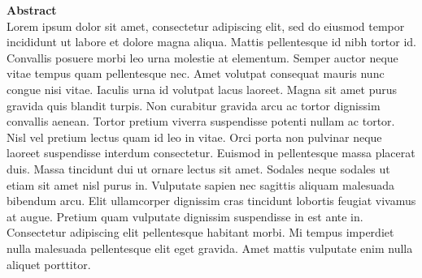 {\Large\textbf{Abstract}}\\

Lorem ipsum dolor sit amet, consectetur adipiscing elit, sed do eiusmod tempor incididunt ut labore et dolore magna aliqua. Mattis pellentesque id nibh tortor id. Convallis posuere morbi leo urna molestie at elementum. Semper auctor neque vitae tempus quam pellentesque nec. Amet volutpat consequat mauris nunc congue nisi vitae. Iaculis urna id volutpat lacus laoreet. Magna sit amet purus gravida quis blandit turpis. Non curabitur gravida arcu ac tortor dignissim convallis aenean. Tortor pretium viverra suspendisse potenti nullam ac tortor. Nisl vel pretium lectus quam id leo in vitae. Orci porta non pulvinar neque laoreet suspendisse interdum consectetur. Euismod in pellentesque massa placerat duis. Massa tincidunt dui ut ornare lectus sit amet. Sodales neque sodales ut etiam sit amet nisl purus in. Vulputate sapien nec sagittis aliquam malesuada bibendum arcu. Elit ullamcorper dignissim cras tincidunt lobortis feugiat vivamus at augue. Pretium quam vulputate dignissim suspendisse in est ante in. Consectetur adipiscing elit pellentesque habitant morbi. Mi tempus imperdiet nulla malesuada pellentesque elit eget gravida. Amet mattis vulputate enim nulla aliquet porttitor.